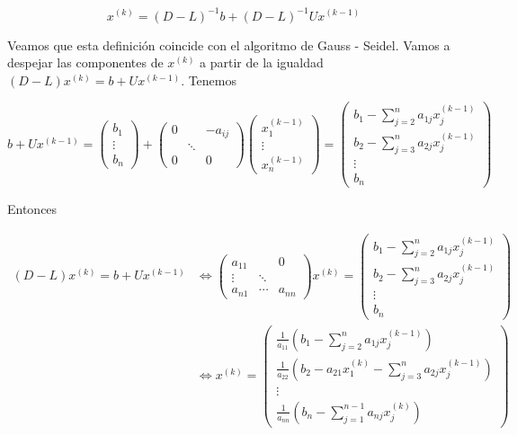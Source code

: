 \[x^{(k)} = (D - L)^{-1}b + (D - L)^{-1}Ux^{(k - 1)}\]

Veamos que esta definición coincide con el algoritmo de Gauss - Seidel. Vamos a despejar las componentes de $x^{(k)}$ a partir de la igualdad $(D - L)x^{(k)} = b + Ux^{(k - 1)}$. Tenemos

\[b + Ux^{(k - 1)} = \begin{pmatrix}
b_1 \\ \vdots \\ b_n
\end{pmatrix} + \begin{pmatrix}
0	 	& 			& -a_{ij}	\\
		& \ddots		& 	\\
0		&			& 0\end{pmatrix} \begin{pmatrix}
x_1^{(k - 1)} \\ \vdots \\ x_n^{(k - 1)}
\end{pmatrix} = \begin{pmatrix}
b_1 - \sum_{j = 2}^n a_{1j}x_j^{(k - 1)}\\
b_2 - \sum_{j = 3}^n a_{2j}x_j^{(k - 1)}\\
\vdots \\
b_n
\end{pmatrix}\]

Entonces

\begin{align*}
(D - L)x^{(k)} = b + Ux^{(k - 1)} &\Leftrightarrow 
\begin{pmatrix}
a_{11} & & 0\\
\vdots & \ddots & \\
a_{n1} & \cdots & a_{nn}
\end{pmatrix}x^{(k)} = \begin{pmatrix}
b_1 - \sum_{j = 2}^n a_{1j}x_j^{(k - 1)}\\
b_2 - \sum_{j = 3}^n a_{2j}x_j^{(k- 1)}\\
\vdots \\
b_n
\end{pmatrix}\\
& \Leftrightarrow 
x^{(k)} = \begin{pmatrix}
\frac{1}{a_{11}}\left(b_1 - \sum_{j = 2}^n a_{1j} x_j^{(k - 1)}\right)\\
\frac{1}{a_{22}}\left(b_2 - a_{21}x_1^{(k)} - \sum_{j = 3}^n a_{2j} x_j^{(k - 1)}\right) \\
\vdots\\
\frac{1}{a_{nn}}\left(b_n - \sum_{j = 1}^{n - 1}a_{nj} x_j^{(k)}\right)
\end{pmatrix}
\end{align*}

